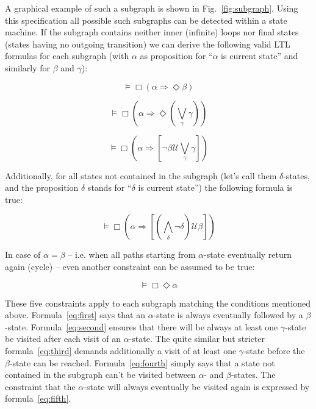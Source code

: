 \documentclass[conference]{IEEEtran}
\begin{document}
A graphical example of such a subgraph is shown in Fig.~\ref{fig:subgraph}. Using this specification all possible such subgraphs can be detected within a state machine. If the subgraph contains neither inner (infinite) loops nor final states (states having no outgoing transition) we can derive the following valid LTL formulas for each subgraph (with $\alpha$ as proposition for ``$\alpha$ is current state'' and similarly for $\beta$ and $\gamma$):

\begin{equation} \label{eq:first}
  \models \Box (\alpha \Rightarrow \Diamond \beta)
\end{equation}

\begin{equation} \label{eq:second}
  \models \Box (\alpha \Rightarrow \Diamond (\bigvee_{\gamma} \gamma))
\end{equation}

\begin{equation} \label{eq:third}
  \models \Box (\alpha \Rightarrow [\neg \beta \mathcal{U} \bigvee_{\gamma} \gamma])
\end{equation}

Additionally, for all states not contained in the subgraph (let's call them $\delta$-states, and the proposition $\delta$ stands for ``$\delta$ is current state'') the following formula is true: 

\begin{equation} \label{eq:fourth}
  \models \Box (\alpha \Rightarrow [(\bigwedge_{\delta} \neg \delta) \mathcal{U} \beta])
\end{equation}

In case of $\alpha = \beta$ -- i.e. when all paths starting from $\alpha$-state eventually return again (cycle) -- even another constraint can be assumed to be true:

\begin{equation} \label{eq:fifth}
  \models \Box \Diamond \alpha
\end{equation}
 

These five constraints apply to each subgraph matching the conditions mentioned above. Formula~\ref{eq:first} says that an $\alpha$-state is always eventually followed by a $\beta$-state. Formula~\ref{eq:second} ensures that there will be always at least one $\gamma$-state be visited after each visit of an $\alpha$-state. The quite similar but stricter formula~\ref{eq:third} demands additionally a visit of at least one $\gamma$-state before the $\beta$-state can be reached. Formula~\ref{eq:fourth} simply says that a state not contained in the subgraph can't be visited between $\alpha$- and $\beta$-states. The constraint that the $\alpha$-state will always eventually be visited again is expressed by formula~\ref{eq:fifth}.
\end{document}
